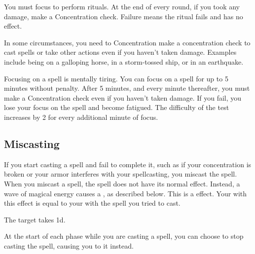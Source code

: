          You must focus to perform rituals.
        At the end of every round, if you took any damage, make a Concentration check.
        Failure means the ritual fails and has no effect.

         In some circumstances, you need to Concentration make a concentration check to cast spells or take other actions even if you haven't taken damage.
        Examples include being on a galloping horse, in a storm-tossed ship, or in an earthquake.

         Focusing on a spell is mentally tiring.
        You can focus on a spell for up to 5 minutes without penalty.
        After 5 minutes, and every minute thereafter, you must make a Concentration check even if you haven't taken damage.
        If you fail, you lose your focus on the spell and become fatigued.
        The difficulty of the test increases by 2 for every additional minute of focus.

    \subsection{Miscasting}\label{Miscasting}

        If you start casting a spell and fail to complete it, such as if your concentration is broken or your armor interferes with your spellcasting, you miscast the spell.
        When you miscast a spell, the spell does not have its normal effect.
        Instead, a wave of magical energy causes a , as described below.
        This is a  effect.
        Your  with this effect is equal to your  with the spell you tried to cast.
        \begin{ability}
            \begin{spelltargetinginfo}
            \end{spelltargetinginfo}
            \begin{spelleffects}
                \spelleffect The target takes  \minus1d.
            \end{spelleffects}
        \end{ability}

        At the start of each phase while you are casting a spell, you can choose to stop casting the spell, causing you to  it instead.

